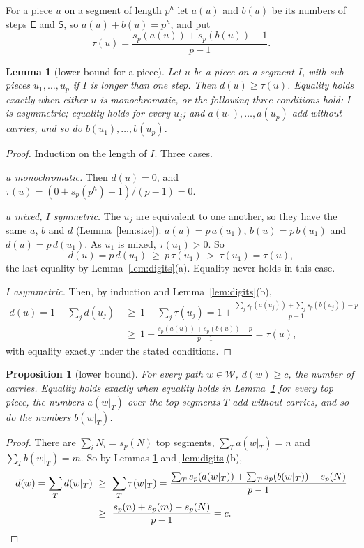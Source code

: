 \documentclass[11pt]{article}
\newtheorem{lemma}[theorem]{Lemma}
\newtheorem{proposition}[theorem]{Proposition}
\theoremstyle{definition}
\theoremstyle{remark}
\newcommand{\E}{\textsf{E}}
\newcommand{\Ss}{\textsf{S}}
\newcommand{\W}{\mathcal{W}}
\begin{document}
For a piece $u$ on a segment of length $p^h$ let $a(u)$ and $b(u)$ be its numbers of steps $\E$ and $\Ss$, so
$a(u)+b(u)=p^h$, and put
\[
\tau(u)=\frac{s_p(a(u))+s_p(b(u))-1}{p-1}.
\]

\begin{lemma}[lower bound for a piece]\label{lem:bound}
Let $u$ be a piece on a segment $I$, with sub-pieces $u_1,\dots,u_p$ if $I$ is longer than one step. Then
$d(u)\ge\tau(u)$. Equality holds exactly when either
$u$ is monochromatic, or the following three conditions hold: $I$ is asymmetric; equality holds for every
$u_j$; and $a(u_1),\dots,a(u_p)$ add without carries, and so do $b(u_1),\dots,b(u_p)$.
\end{lemma}
\begin{proof}
Induction on the length of $I$. Three cases.

\emph{$u$ monochromatic.} Then $d(u)=0$, and $\tau(u)=(0+s_p(p^h)-1)/(p-1)=0$.

\emph{$u$ mixed, $I$ symmetric.} The $u_j$ are equivalent to one another, so they have the same $a$, $b$ and $d$
(Lemma~\ref{lem:size}): $a(u)=p\,a(u_1)$, $b(u)=p\,b(u_1)$ and $d(u)=p\,d(u_1)$. As $u_1$ is mixed,
$\tau(u_1)>0$. So
\[
d(u)=p\,d(u_1)\ \ge\ p\,\tau(u_1)\ >\ \tau(u_1)=\tau(u),
\]
the last equality by Lemma~\ref{lem:digits}(a). Equality never holds in this case.

\emph{$I$ asymmetric.} Then, by induction and Lemma~\ref{lem:digits}(b),
\begin{align*}
d(u)=1+\sum_j d(u_j)\ &\ge\ 1+\sum_j\tau(u_j)
=1+\frac{\sum_j s_p(a(u_j))+\sum_j s_p(b(u_j))-p}{p-1}\\
&\ge\ 1+\frac{s_p(a(u))+s_p(b(u))-p}{p-1}=\tau(u),
\end{align*}
with equality exactly under the stated conditions.
\end{proof}

\begin{proposition}[lower bound]\label{prop:bound}
For every path $w\in\W$, $d(w)\ge c$, the number of carries. Equality holds exactly when equality holds in
Lemma~\ref{lem:bound} for every top piece, the numbers $a(w|_T)$ over the top segments $T$ add without carries,
and so do the numbers $b(w|_T)$.
\end{proposition}
\begin{proof}
There are $\sum_iN_i=s_p(N)$ top segments, $\sum_Ta(w|_T)=n$ and $\sum_Tb(w|_T)=m$. So by
Lemmas \ref{lem:bound} and \ref{lem:digits}(b),
\begin{align*}
d(w)=\sum_T d(w|_T)\ &\ge\ \sum_T\tau(w|_T)=\frac{\sum_Ts_p(a(w|_T))+\sum_Ts_p(b(w|_T))-s_p(N)}{p-1}\\
&\ge\ \frac{s_p(n)+s_p(m)-s_p(N)}{p-1}=c. \qedhere
\end{align*}
\end{proof}
\end{document}
